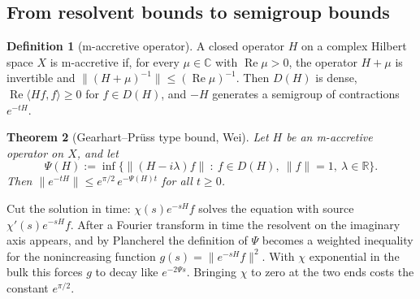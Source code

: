 \documentclass[11pt]{article}
\makeatletter
\newtheorem{theorem}{Theorem}
\theoremstyle{definition}
\newtheorem{definition}[theorem]{Definition}
\theoremstyle{remark}
\newcommand{\ed@runin}[1]{\par\topsep6\p@\@plus6\p@\relax\trivlist\item[\hskip\labelsep\itshape#1\@addpunct{.}]\ignorespaces}
\newenvironment{idea}[1][Idea]{\ed@runin{#1}}{\endtrivlist\@endpefalse}
\makeatother
\begin{document}
\subsection{From resolvent bounds to semigroup bounds}
\begin{definition}[m-accretive operator]\label{def-m-accretive}
A closed operator $H$ on a complex Hilbert space $X$ is m-accretive if, for every $\mu\in\mathbb{C}$ with $\operatorname{Re}\mu>0$, the operator $H+\mu$ is invertible and $\|(H+\mu)^{-1}\|\leq(\operatorname{Re}\mu)^{-1}$. Then $D(H)$ is dense, $\operatorname{Re}\langle Hf,f\rangle\geq0$ for $f\in D(H)$, and $-H$ generates a semigroup of contractions $e^{-tH}$.
\end{definition}
\begin{theorem}[Gearhart–Prüss type bound, Wei]\label{thm-gearhart-pruss-wei}
Let $H$ be an m-accretive operator on $X$, and let
\[\Psi(H):=\inf\big\{\|(H-i\lambda)f\|\ :\ f\in D(H),\ \|f\|=1,\ \lambda\in\mathbb{R}\big\}.\]
Then $\|e^{-tH}\|\leq e^{\pi/2}\,e^{-\Psi(H)t}$ for all $t\geq0$.
\end{theorem}
\begin{idea}
Cut the solution in time: $\chi(s)e^{-sH}f$ solves the equation with source $\chi'(s)e^{-sH}f$. After a Fourier transform in time the resolvent on the imaginary axis appears, and by Plancherel the definition of $\Psi$ becomes a weighted inequality for the nonincreasing function $g(s)=\|e^{-sH}f\|^2$. With $\chi$ exponential in the bulk this forces $g$ to decay like $e^{-2\Psi s}$. Bringing $\chi$ to zero at the two ends costs the constant $e^{\pi/2}$.
\end{idea}
\end{document}
